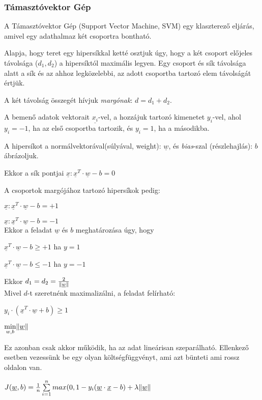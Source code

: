 \subsubsection{Támasztóvektor Gép}

A Támasztóvektor Gép (Support Vector Machine, SVM) egy klaszterező eljárás, amivel egy adathalmaz két csoportra bontható. 

Alapja, hogy teret egy hipersíkkal ketté osztjuk úgy, hogy a két csoport előjeles távolsága ($ d_1, d_2 $) a hipersíktól maximális legyen. 
Egy csoport és sík távolsága alatt a sík és az ahhoz legközelebbi, az adott csoportba tartozó elem távolságát értjük. 


A két távolság összegét hívjuk \textit{margónak}: $ d = d_1 + d_2 $.

A bemenő adatok vektorait $ \underline{x_i} $-vel, a hozzájuk tartozó kimenetet
$ y_i $-vel, ahol $ y_i=-1 $, ha az első csoportba tartozik, és $ y_i=1 $, ha a másodikba.

A hipersíkot a normálvektorával(súlyával, weight): $ \underline{w} $, és \textit{bias}-szal 
(részlehajlás): $ b $ ábrázoljuk.


Ekkor a sík pontjai $ \underline{x}: \underline{x}^T \cdot \underline{w} - b = 0 $

A csoportok margójához tartozó hipersíkok pedig:

$ \underline{x}: \underline{x}^T \cdot \underline{w} - b = +1 $

$ \underline{x}: \underline{x}^T \cdot \underline{w} - b = -1 $
\\
Ekkor a feladat $ \underline{w} $ és $ b $ meghatározása úgy, hogy 

$ \underline{x}^T \cdot \underline{w} - b \geq +1 $ ha $  y=1 $

$ \underline{x}^T \cdot \underline{w} - b \leq -1 $ ha $  y=-1 $

Ekkor $ d_1 = d_2 = \frac{2}{\lVert\underline{w}\rVert} $  
\\
Mivel $ d $-t szeretnénk maximalizálni, a feladat felírható:

$ y_i \cdot (\underline{x}^T \cdot \underline{w} + b) \geq 1 $

$ \min\limits_{w, b} \lVert\underline{w}\rVert $

Ez azonban csak akkor működik, ha az adat lineárisan szeparálható. Ellenkező esetben
vezessünk be egy olyan költségfüggvényt, ami azt bünteti ami rossz oldalon van.

$ J(\underline{w},b)  = \frac{1}{n} \sum\limits_{i=1}^{n} 
max(0, 1 - y_i(\underline{w} \cdot \underline{x} - b) + \lambda \lVert\underline{w}\rVert $



